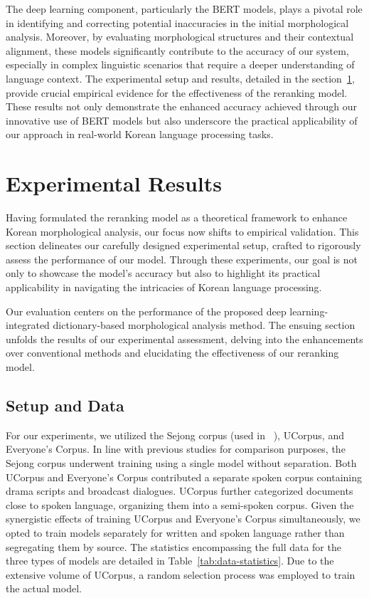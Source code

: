\documentclass[AMS,STIX2COL]{WileyNJD-v2}
\begin{document}
    The deep learning component, particularly the BERT models, plays a pivotal role in identifying and correcting potential inaccuracies in the initial morphological analysis.
    Moreover, by evaluating morphological structures and their contextual alignment, these models significantly contribute to the accuracy of our system, especially in complex linguistic scenarios that require a deeper understanding of language context.
    The experimental setup and results, detailed in the section~\ref{sec:results}, provide crucial empirical evidence for the effectiveness of the reranking model.
    These results not only demonstrate the enhanced accuracy achieved through our innovative use of BERT models but also underscore the practical applicability of our approach in real-world Korean language processing tasks.


    \section{Experimental Results}\label{sec:results}

    Having formulated the reranking model as a theoretical framework to enhance Korean morphological analysis, our focus now shifts to empirical validation.
    This section delineates our carefully designed experimental setup, crafted to rigorously assess the performance of our model.
    Through these experiments, our goal is not only to showcase the model's accuracy but also to highlight its practical applicability in navigating the intricacies of Korean language processing.

    Our evaluation centers on the performance of the proposed deep learning-integrated dictionary-based morphological analysis method.
    The ensuing section unfolds the results of our experimental assessment, delving into the enhancements over conventional methods and elucidating the effectiveness of our reranking model.

    \subsection{Setup and Data}\label{subsec:setup-and-data}

    For our experiments, we utilized the Sejong corpus (used in ~\cite{MinJW2019, MinJW2020, MinJW2022, MinJW2018, NaSH2015, NaSH2014, NaSH2018, SongHJ2019, SongHJ2020}), UCorpus\cite{UCorpusHG}, and Everyone's Corpus\cite{EveryoneCorpus}.
    In line with previous studies for comparison purposes, the Sejong corpus underwent training using a single model without separation.
    Both UCorpus and Everyone's Corpus contributed a separate spoken corpus containing drama scripts and broadcast dialogues.
    UCorpus further categorized documents close to spoken language, organizing them into a semi-spoken corpus.
    Given the synergistic effects of training UCorpus and Everyone's Corpus simultaneously, we opted to train models separately for written and spoken language rather than segregating them by source.
    The statistics encompassing the full data for the three types of models are detailed in Table~\ref{tab:data-statistics}.
    Due to the extensive volume of UCorpus, a random selection process was employed to train the actual model.
\end{document}

